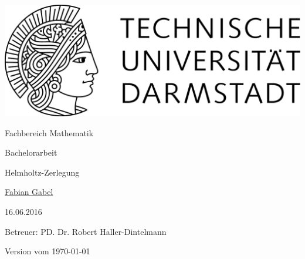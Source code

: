 \begin{titlepage}
  \begin{center}
    \vspace{1cm}
    \includegraphics[width=0.5\linewidth]{TU_Darmstadt_Logo.pdf}
    \vspace{12pt}
    
    \large{Fachbereich Mathematik}
    \vspace{2cm}
    
    \large{Bachelorarbeit}
    \vspace{2cm}

    \huge{Helmholtz-Zerlegung}
    
    \vspace*{2cm}    
    
		\large
                \href{mailto:gabel@mathematik.tu-darmstadt.de}{Fabian Gabel}
    \vspace*{.5cm}

    16.06.2016 \\
    \vspace*{1cm}

    Betreuer: PD. Dr. Robert Haller-Dintelmann

    \vspace*{.5cm}

    \tiny{Version vom \today}
  \end{center}
\end{titlepage}
\vspace*{\fill}
